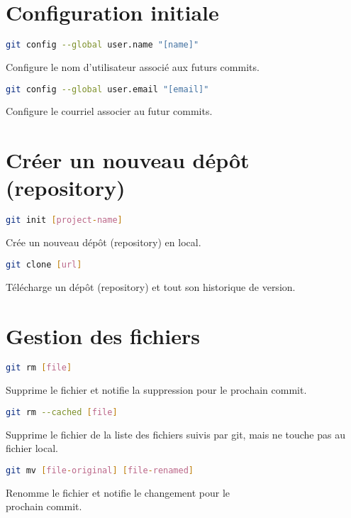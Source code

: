 \documentclass[10pt,landscape]{article}
\begin{document}
\raggedright
\footnotesize
\begin{multicols*}{3}


\setlength{\premulticols}{1pt}
\setlength{\postmulticols}{1pt}
\setlength{\multicolsep}{1pt}
\setlength{\columnsep}{2pt}

\section{Configuration initiale}
\begin{lstlisting}[language=bash]
git config --global user.name "[name]"
\end{lstlisting}
Configure le nom d’utilisateur associé aux futurs commits.
\begin{lstlisting}[language=bash]
git config --global user.email "[email]"
\end{lstlisting}
Configure le courriel associer au futur commits.


\section{Créer un nouveau dépôt (repository)}
\begin{lstlisting}[language=bash]
git init [project-name]
\end{lstlisting}
Crée un nouveau dépôt (repository) en local.\\
\begin{lstlisting}[language=bash]
git clone [url]
\end{lstlisting}
Télécharge un dépôt (repository) et tout son historique de version.


\section{Gestion des fichiers}
\begin{lstlisting}[language=bash]
git rm [file]
\end{lstlisting}
Supprime le fichier et notifie la suppression pour le prochain commit.\\
\begin{lstlisting}[language=bash]
git rm --cached [file]
\end{lstlisting}
Supprime le fichier de la liste des fichiers suivis par git, mais ne touche pas au fichier local.\\
\begin{lstlisting}[language=bash]
git mv [file-original] [file-renamed]
\end{lstlisting}
Renomme le fichier et notifie le changement pour le\\
prochain commit.


\end{multicols*}
\end{document}
